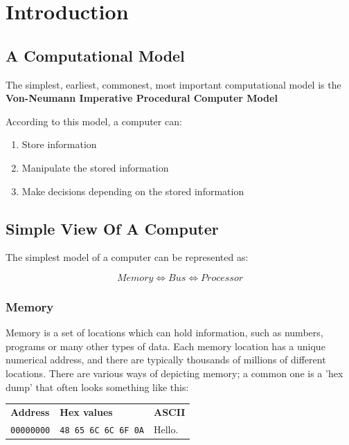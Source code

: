 
\section{Introduction}
\subsection{A Computational Model}

The simplest, earliest, commonest, most important computational model is the
\textbf{Von-Neumann Imperative Procedural Computer Model}

According to this model, a computer can:
\begin{enumerate}
	\item Store information
	\item Manipulate the stored information
	\item Make decisions depending on the stored information
\end{enumerate}

\subsection{Simple View Of A Computer}
The simplest model of a computer can be represented as:

\[
	Memory \Leftrightarrow Bus \Leftrightarrow Processor
\]

\subsubsection{Memory}

Memory is a set of locations which can hold information, such as numbers,
programs or many other types of data. Each memory location has a unique
numerical address, and there are typically thousands of millions of different
locations. There are various ways of depicting memory; a common one is a 'hex
dump' that often looks something like this: 

\begin{center}
	\begin{tabular}{l l l}
		{\bf Address}     &	{\bf Hex values}	&	{\bf ASCII}\\
		{\tt 00000000}	&	{\tt 48 65 6C 6C 6F 0A}		&	Hello.\\
	\end{tabular}
\end{center}

